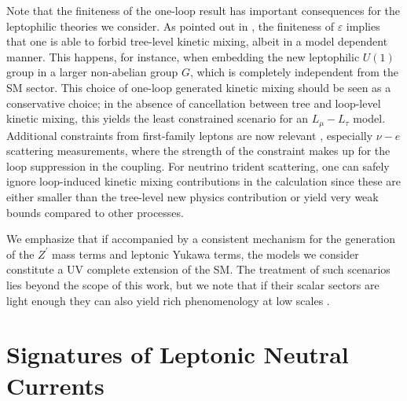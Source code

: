 Note that the finiteness of the one-loop result has important consequences for the leptophilic theories we consider. As pointed out in , the finiteness of $\varepsilon$ implies that one is able to forbid tree-level kinetic mixing, albeit in a model dependent manner. This happens, for instance, when embedding the new leptophilic $U(1)$ group in a larger non-abelian group $G$, which is completely independent from the SM sector. This choice of one-loop generated kinetic mixing should be seen as a conservative choice; in the absence of cancellation between tree and loop-level kinetic mixing, this yields the least constrained scenario for an $L_\mu-L_\tau$ model. Additional constraints from first-family leptons are now relevant \cite{Kamada:2015era,Araki:2015mya}, especially $\nu-e$ scattering measurements, where the strength of the constraint makes up for the loop suppression in the coupling. For neutrino trident scattering, one can safely ignore loop-induced kinetic mixing contributions in the calculation since these are either smaller than the tree-level new physics contribution or yield very weak bounds compared to other processes. 

We emphasize that if accompanied by a consistent mechanism for the generation of the $Z^\prime$ mass terms and leptonic Yukawa terms, the models we consider constitute a UV complete extension of the SM. The treatment of such scenarios lies beyond the scope of this work, but we note that if their scalar sectors are light enough they can also yield rich phenomenology at low scales \cite{Heeck:2011wj}.

\section{\label{sec:signatures}Signatures of Leptonic Neutral Currents}

